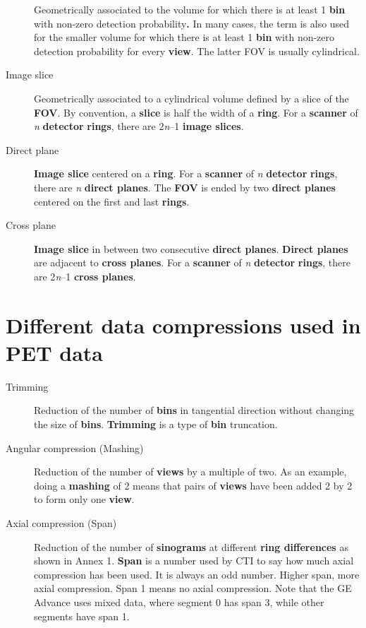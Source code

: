 \documentclass{article}
\begin{document}
\begin{description}
Geometrically associated to the volume for which there is at 
least 1 \textbf{bin} with non-zero detection probability\textbf{.} In many 
cases, the term is also used for the smaller volume for which 
there is at least 1 \textbf{bin} with non-zero detection probability 
for every \textbf{view}. The latter FOV is usually cylindrical.
\item[Image slice] 
Geometrically associated to a cylindrical volume defined by 
a slice of the \textbf{FOV}. By convention, a \textbf{slice} is half the 
width of a \textbf{ring}. For a \textbf{scanner} of \textit{n} \textbf{detector} \textbf{rings}, 
there are 2\textit{n}--1 \textbf{image slices}.
\item[Direct plane] 
\textbf{Image slice} centered on a \textbf{ring}. For a \textbf{scanner} of \textit{n} \textbf{detector} \textbf{rings}, 
there are \textit{n} \textbf{direct planes}. The \textbf{FOV} is ended by two \textbf{direct 
planes} centered on the first and last \textbf{rings}.
\item[Cross plane] 
\textbf{Image slice} in between two consecutive \textbf{direct planes}. \textbf{Direct 
planes} are adjacent to \textbf{cross planes}. For a \textbf{scanner} of \textit{n} \textbf{detector} \textbf{rings}, 
there are 2\textit{n}--1 \textbf{cross planes}.
\end{description}

\section*{Different data compressions used in PET data}
\begin{description}
\item[Trimming] 
Reduction of the number of \textbf{bins} in tangential direction without 
changing the size of \textbf{bins}. \textbf{Trimming} is a type of \textbf{bin} 
truncation.
\item[Angular compression (Mashing)] 
Reduction of the number of \textbf{views} by a multiple of two. As 
an example, doing a \textbf{mashing} of 2 means that pairs of \textbf{views} 
have been added 2 by 2 to form only one \textbf{view}.
\item[Axial compression (Span)] 
Reduction of the number of \textbf{sinograms} at different \textbf{ring 
differences} as shown in Annex 1. \textbf{Span} is a number used by 
CTI to say how much axial compression has been used. It is always 
an odd number. Higher span, more axial compression. Span 1 means 
no axial compression. Note that the GE Advance uses mixed data, 
where segment 0 has span 3, while other segments have span 1.
\end{description}
\end{document}
